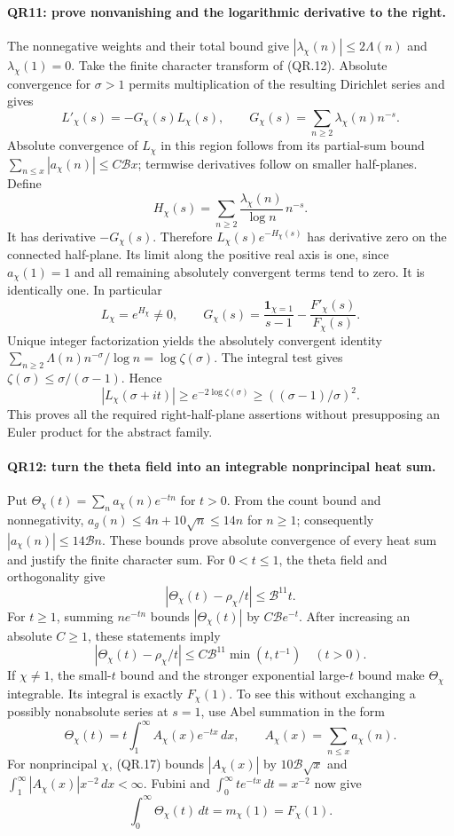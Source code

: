 \paragraph{QR11: prove nonvanishing and the logarithmic derivative to the right.}
The nonnegative weights and their total bound give
$|\lambda_\chi(n)|\le2\Lambda(n)$ and $\lambda_\chi(1)=0$.
Take the finite character transform of (QR.12). Absolute convergence
for $\sigma>1$ permits multiplication of the resulting Dirichlet
series and gives
\[
 L'_\chi(s)=-G_\chi(s)L_\chi(s),\qquad
 G_\chi(s)=\sum_{n\ge2}\lambda_\chi(n)n^{-s}.             \tag{QR.21}
\]
Absolute convergence of $L_\chi$ in this region follows from its
partial-sum bound $\sum_{n\le x}|a_\chi(n)|\le C\mathcal Bx$;
termwise derivatives follow on smaller half-planes. Define
\[
 H_\chi(s)=\sum_{n\ge2}\frac{\lambda_\chi(n)}{\log n}\,n^{-s}.
\]
It has derivative $-G_\chi(s)$. Therefore
$L_\chi(s)e^{-H_\chi(s)}$ has derivative zero on the connected
half-plane. Its limit along the positive real axis is one, since
$a_\chi(1)=1$ and all remaining absolutely convergent terms tend to
zero. It is identically one. In particular
\[
 L_\chi=e^{H_\chi}\ne0,\qquad
 G_\chi(s)=\frac{\mathbf1_{\chi=1}}{s-1}
                        -\frac{F'_\chi(s)}{F_\chi(s)}.    \tag{QR.22}
\]
Unique integer factorization yields the absolutely convergent identity
$\sum_{n\ge2}\Lambda(n)n^{-\sigma}/\log n=\log\zeta(\sigma)$.
The integral test gives $\zeta(\sigma)\le\sigma/(\sigma-1)$.
Hence
\[
 |L_\chi(\sigma+it)|\ge e^{-2\log\zeta(\sigma)}
                       \ge((\sigma-1)/\sigma)^2.          \tag{QR.23}
\]
This proves all the required right-half-plane assertions without
presupposing an Euler product for the abstract family.

\paragraph{QR12: turn the theta field into an integrable nonprincipal heat sum.}
Put $\Theta_\chi(t)=\sum_n a_\chi(n)e^{-tn}$ for $t>0$.
From the count bound and nonnegativity,
$a_g(n)\le4n+10\sqrt n\le14n$ for $n\ge1$; consequently
$|a_\chi(n)|\le14\mathcal B n$. These bounds prove absolute
convergence of every heat sum and justify the finite character sum.
For $0<t\le1$, the theta field and orthogonality give
\[
       |\Theta_\chi(t)-\rho_\chi/t|\le\mathcal B^{11}t.
\]
For $t\ge1$, summing $n e^{-tn}$ bounds $|\Theta_\chi(t)|$
by $C\mathcal B e^{-t}$. After increasing an absolute $C\ge1$,
these statements imply
\[
 |\Theta_\chi(t)-\rho_\chi/t|
      \le C\mathcal B^{11}\min(t,t^{-1})\quad(t>0).       \tag{QR.24}
\]
If $\chi\ne1$, the small-$t$ bound and the stronger exponential
large-$t$ bound make $\Theta_\chi$ integrable. Its integral is
exactly $F_\chi(1)$. To see this without exchanging a possibly
nonabsolute series at $s=1$, use Abel summation in the form
\[
 \Theta_\chi(t)=t\int_1^\infty A_\chi(x)e^{-tx}\,dx,
      \qquad A_\chi(x)=\sum_{n\le x}a_\chi(n).
\]
For nonprincipal $\chi$, (QR.17) bounds $|A_\chi(x)|$ by
$10\mathcal B\sqrt x$ and
$\int_1^\infty|A_\chi(x)|x^{-2}\,dx<\infty$.
Fubini and $\int_0^\infty t e^{-tx}\,dt=x^{-2}$ now give
\[
                  \int_0^\infty\Theta_\chi(t)\,dt
                          =m_\chi(1)=F_\chi(1).           \tag{QR.25}
\]

